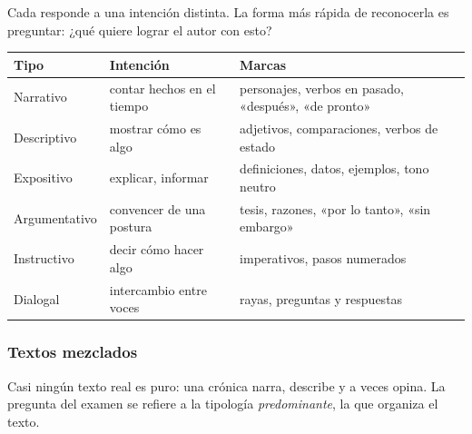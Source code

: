 

Cada  responde a una intención distinta. La forma más rápida de reconocerla es preguntar: ¿qué quiere
lograr el autor con esto?

\begin{center}\small
\begin{tabularx}{\linewidth}{@{}l>{\raggedright\arraybackslash}X>{\raggedright\arraybackslash}X@{}}
\toprule
\textbf{Tipo} & \textbf{Intención} & \textbf{Marcas}\\\midrule
Narrativo & contar hechos en el tiempo & personajes, verbos en pasado, «después», «de pronto»\\
Descriptivo & mostrar cómo es algo & adjetivos, comparaciones, verbos de estado\\
Expositivo & explicar, informar & definiciones, datos, ejemplos, tono neutro\\
Argumentativo & convencer de una postura & tesis, razones, «por lo tanto», «sin embargo»\\
Instructivo & decir cómo hacer algo & imperativos, pasos numerados\\
Dialogal & intercambio entre voces & rayas, preguntas y respuestas\\\bottomrule
\end{tabularx}
\end{center}

\subsubsection{Textos mezclados}
Casi ningún texto real es puro: una crónica narra, describe y a veces opina. La pregunta del examen se refiere a la
tipología \emph{predominante}, la que organiza el texto.


